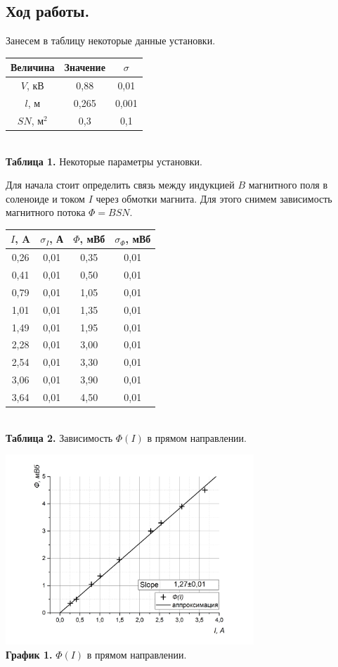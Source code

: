 \documentclass[a4paper, 12pt]{article}%
\begin{document}
\subsection*{Ход работы.}
Занесем в таблицу некоторые данные установки.
\begin{center}
\begin{tabular}{|c|c|c|}
\hline
Величина & Значение & $\sigma$ \\ \hline
$V$, кВ & 0,88 & 0,01 \\ \hline
$l$, м & 0,265 & 0,001 \\ \hline
$SN$, м$^2$ & 0,3 & 0,1 \\ \hline
\end{tabular}\\
\textbf{Таблица 1.} Некоторые параметры установки.
\end{center}
Для начала стоит определить связь между индукцией $B$ магнитного поля в соленоиде и током $I$ через обмотки магнита. Для этого снимем зависимость магнитного потока $\Phi = BSN$.
  \begin{center}
  \begin{tabular}{|c|c|c|c|}
\hline
$I$, A & $\sigma_I$, А & $\Phi$, мВб & $\sigma_{\Phi}$, мВб \\ \hline
0,26 & 0,01 & 0,35 & 0,01 \\ \hline
0,41 & 0,01 & 0,50 & 0,01 \\ \hline
0,79 & 0,01 & 1,05 & 0,01 \\ \hline
1,01 & 0,01 & 1,35 & 0,01 \\ \hline
1,49 & 0,01 & 1,95 & 0,01 \\ \hline
2,28 & 0,01 & 3,00 & 0,01 \\ \hline
2,54 & 0,01 & 3,30 & 0,01 \\ \hline
3,06 & 0,01 & 3,90 & 0,01 \\ \hline
3,64 & 0,01 & 4,50 & 0,01 \\ \hline
\end{tabular}\\
  \textbf{Таблица 2.} Зависимость $\Phi (I)$ в прямом направлении.\\
  \end{center}
  \begin{center}
    \includegraphics[width = 0.7\textwidth]{2.jpg}\\
  \textbf{График 1.} $\Phi (I)$ в прямом направлении.
  \end{center}
\end{document}
